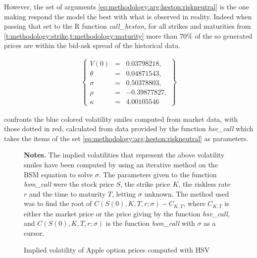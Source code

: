 \documentclass[12pt,a4paper]{report}
\begin{document}
However, the set of arguments \ref{eq:methodology:arg:heston:riskneutral} is the one making respond the model the best with what is observed in reality.
Indeed when passing that set to the R function \textit{call\_heston}, for all strikes and maturities from \cref{t:methodology:strike,t:methodology:maturity}  more than $70\%$ of the so generated prices are within the bid-ask spread of the historical data.

\begin{align}
  \left \{
  \begin{array}{lcl}
    V(0) &= &0.03798218, \\
    \theta &= &0.04871543, \\
    \sigma &= &0.50378803, \\
    \rho &= &-0.39877827, \\
    \kappa &= &4.00105546 
  \end{array}
  \right \}  
  \label{eq:methodology:arg:heston:riskneutral}
\end{align}

 confronts the blue colored volatility smiles computed from market data, with those dotted in red, calculated from data provided by the function \textit{hsv\_call} which takes the items of the set \ref{eq:methodology:arg:heston:riskneutral} as parameters.

\begin{figure}[h]
  \centering
  
  \caption{Implied volatility of Apple option prices computed with HSV}
  \begin{changemargin}{0.5cm}{0.5cm}
  \medskip
\footnotesize
{}\textbf{Notes.} The implied volatilities that represent the above volatility smiles have been computed by using an iterative method on the BSM equation to solve  $\sigma$.
The parameters given to the function \textit{bsm\_call} were the stock price $S$, the strike price $K$, the riskless rate $r$ and the time to maturity $T$, letting $\sigma$ unknown.
The method used was to find the root of $C(S(0), K, T, r; \sigma) - C_{K, T}$, where $C_{K, T}$ is either the market price or the price giving by the function \textit{hsv\_call}, and $C(S(0), K, T, r; \sigma)$ is the function \textit{bsm\_call} with $\sigma$ as a cursor.
  \end{changemargin}
  \label{p:methodology:impliedvol:aapl:heston}
\end{figure}
\end{document}
